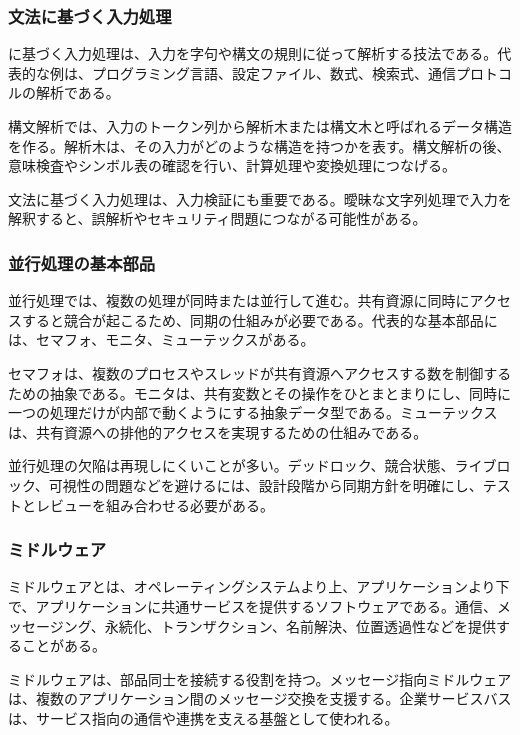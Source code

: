\subsubsection{文法に基づく入力処理}

に基づく入力処理は、入力を字句や構文の規則に従って解析する技法である。代表的な例は、プログラミング言語、設定ファイル、数式、検索式、通信プロトコルの解析である。

構文解析では、入力のトークン列から解析木または構文木と呼ばれるデータ構造を作る。解析木は、その入力がどのような構造を持つかを表す。構文解析の後、意味検査やシンボル表の確認を行い、計算処理や変換処理につなげる。

文法に基づく入力処理は、入力検証にも重要である。曖昧な文字列処理で入力を解釈すると、誤解析やセキュリティ問題につながる可能性がある。

\subsubsection{並行処理の基本部品}

並行処理では、複数の処理が同時または並行して進む。共有資源に同時にアクセスすると競合が起こるため、同期の仕組みが必要である。代表的な基本部品には、セマフォ、モニタ、ミューテックスがある。

セマフォは、複数のプロセスやスレッドが共有資源へアクセスする数を制御するための抽象である。モニタは、共有変数とその操作をひとまとまりにし、同時に一つの処理だけが内部で動くようにする抽象データ型である。ミューテックスは、共有資源への排他的アクセスを実現するための仕組みである。

並行処理の欠陥は再現しにくいことが多い。デッドロック、競合状態、ライブロック、可視性の問題などを避けるには、設計段階から同期方針を明確にし、テストとレビューを組み合わせる必要がある。

\subsubsection{ミドルウェア}

ミドルウェアとは、オペレーティングシステムより上、アプリケーションより下で、アプリケーションに共通サービスを提供するソフトウェアである。通信、メッセージング、永続化、トランザクション、名前解決、位置透過性などを提供することがある。

ミドルウェアは、部品同士を接続する役割を持つ。メッセージ指向ミドルウェアは、複数のアプリケーション間のメッセージ交換を支援する。企業サービスバスは、サービス指向の通信や連携を支える基盤として使われる。

